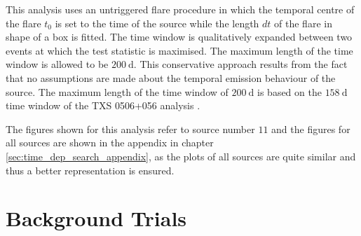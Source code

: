 This analysis uses an untriggered flare procedure in which the temporal centre of the flare $t_0$ is set to the time of the source while the length $dt$ of the flare in shape of a box is fitted.
The time window is qualitatively expanded between two events at which the test statistic is maximised.
The maximum length of the time window is allowed to be $\SI{200}{\day}$.
This conservative approach results from the fact that no assumptions are made about the temporal emission behaviour of the source.
The maximum length of the time window of $\SI{200}{\day}$ is based on the $\SI{158}{\day}$ time window of the TXS 0506+056 analysis \cite{txs}.

The figures shown for this analysis refer to source number $\num{11}$ and the figures for all sources are shown in the appendix in chapter \ref{sec:time_dep_search_appendix}, as the plots of all sources are quite similar and thus a better representation is ensured.

\section{Background Trials}

